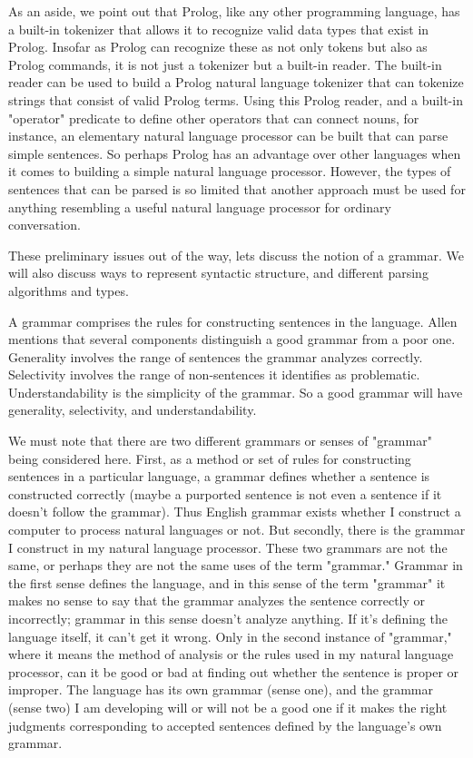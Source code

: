 As an aside, we point out that Prolog, like any other programming language, has a built-in tokenizer that allows it to recognize valid data types that exist in Prolog. Insofar as Prolog can recognize these as not only tokens but also as Prolog commands, it is not just a tokenizer but a built-in reader. The built-in reader can be used to build a Prolog natural language tokenizer that can tokenize strings that consist of valid Prolog terms. Using this Prolog reader, and a built-in "operator" predicate to define other operators that can connect nouns, for instance, an elementary natural language processor can be built that can parse simple sentences. So perhaps Prolog has an advantage over other languages when it comes to building a simple natural language processor. However, the types of sentences that can be parsed is so limited that another approach must be used for anything resembling a useful natural language processor for ordinary conversation.

These preliminary issues out of the way, lets discuss the notion of a grammar. We will also discuss ways to represent syntactic structure, and different parsing algorithms and types.

A grammar comprises the rules for constructing sentences in the language. Allen mentions that several components distinguish a good grammar from a poor one. Generality involves the range of sentences the grammar analyzes correctly. Selectivity involves the range of non-sentences it identifies as problematic. Understandability is the simplicity of the grammar. So a good grammar will have generality, selectivity, and understandability.

We must note that there are two different grammars or senses of "grammar" being considered here. First, as a method or set of rules for constructing sentences in a particular language, a grammar defines whether a sentence is constructed correctly (maybe a purported sentence is not even a sentence if it doesn't follow the grammar). Thus English grammar exists whether I construct a computer to process natural languages or not. But secondly, there is the grammar I construct in my natural language processor. These two grammars are not the same, or perhaps they are not the same uses of the term "grammar." Grammar in the first sense defines the language, and in this sense of the term "grammar" it makes no sense to say that the grammar analyzes the sentence correctly or incorrectly; grammar in this sense doesn't analyze anything. If it's defining the language itself, it can't get it wrong. Only in the second instance of "grammar," where it means the method of analysis or the rules used in my natural language processor, can it be good or bad at finding out whether the sentence is proper or improper. The language has its own grammar (sense one), and the grammar (sense two) I am developing will or will not be a good one if it makes the right judgments corresponding to accepted sentences defined by the language's own grammar.

